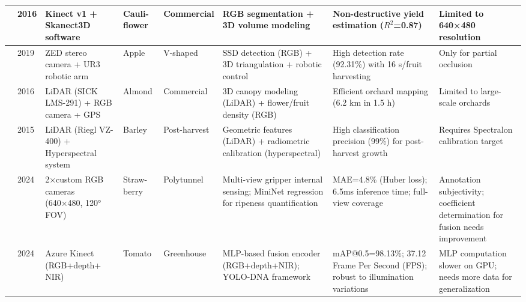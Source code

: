 \documentclass[a4paper,fleqn]{cas-dc}
\begin{document}
\begin{table}[ht]
\begin{tabular}{p{}p{}p{}p{}p{}p{}p{}p{}}
\hline
\cite{andujar2016using} & 2016 & Kinect v1 + Skanect3D software & Cauli- flower & Commercial & RGB segmentation + 3D volume modeling & Non-destructive yield estimation ($R^2$=0.87) & Limited to 640×480 resolution \\ 
\hline
\cite{onishi2019automated} & 2019 & ZED stereo camera + UR3 robotic arm & Apple & V-shaped & SSD detection (RGB) + 3D triangulation + robotic control & High detection rate (92.31\%) with 16 s/fruit harvesting & Only for partial occlusion \\ 
\hline
\cite{underwood2016mapping} & 2016 & LiDAR (SICK LMS-291) + RGB camera + GPS & Almond & Commercial & 3D canopy modeling (LiDAR) + flower/fruit density (RGB) & Efficient orchard mapping (6.2 km in 1.5 h) & Limited to large-scale orchards  \\ 
\hline
\cite{koenig2015comparative} & 2015 & LiDAR (Riegl VZ-400) + Hyperspectral system & Barley & Post-harvest & Geometric features (LiDAR) + radiometric calibration (hyperspectral) & High classification precision (99\%) for post-harvest growth & Requires Spectralon calibration target  \\ 
\hline
\cite{ge2024multi} & 2024 & 2×custom RGB cameras (640×480, 120° FOV) & Straw- berry & Polytunnel & Multi-view gripper internal sensing; MiniNet regression for ripeness quantification & MAE=4.8\% (Huber loss); 6.5ms inference time; full-view coverage & Annotation subjectivity; coefficient determination for fusion needs improvement \\
\hline
\cite{chen2024mlp} & 2024 & Azure Kinect (RGB+depth+ NIR) & Tomato & Greenhouse & MLP-based fusion encoder (RGB+depth+NIR); YOLO-DNA framework & mAP@0.5=98.13\%; 37.12 Frame Per Second (FPS); robust to illumination variations & MLP computation slower on GPU; needs more data for generalization  \\
\hline
\end{tabular}
\end{table}
\end{document}
